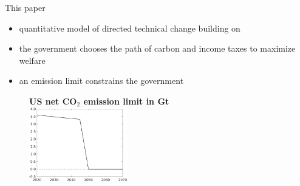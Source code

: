 \documentclass[11pt,aspectratio=169]{beamer}
\begin{document}
\begin{frame}{This paper}
	\vspace{-2mm}
	\begin{itemize}
\item<+-> quantitative model of \alert{directed technical change} building on \cite{Fried2018ClimateAnalysis}
\vspace{2mm}
		\item<+->   the government   chooses the \alert{path of carbon and income taxes} to maximize welfare\vspace{2mm}
		\item<+-> an \alert{emission limit} constrains the government
	\end{itemize}
\pause
\begin{center}
	\begin{figure}
		\centering
		\textbf{US net CO$_2$ emission limit in Gt}\\
		\vspace{2mm}	\includegraphics[width=0.38\textwidth]{../codding_model/own_basedOnFried/optimalPol_010922_revision/figures/all_13Sept22_Tplus30/Emnet.png}
	\end{figure}
\end{center}
\end{frame}
\end{document}

